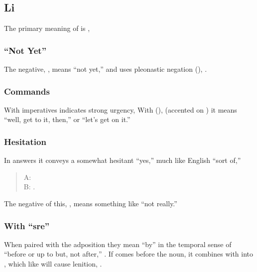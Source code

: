 \subsection{Li}  The primary meaning of  is ,
 

\subsubsection{``Not Yet''} The negative, , means ``not
yet,'' and uses pleonastic negation (),
 .



\subsubsection{Commands} With imperatives  indicates strong
urgency,    With  (),  (accented on ) it means ``well, get to it, then,'' or
``let's get on it.''

\subsubsection{Hesitation} In answers it conveys a somewhat hesitant
``yes,'' much like English ``sort of,''

\begin{quotation}
\noindent A:  \\
\noindent B:  .
\end{quotation}

\noindent The negative of this, , means something like ``not
really.'' 

\subsubsection{With ``sre''} When paired with the adposition 
they mean ``by'' in the temporal sense of ``before or up to but, not
after,''  .\label{syn:li:sre} If  comes before the noun, it
combines with  into , which like  will
cause lenition,  .



